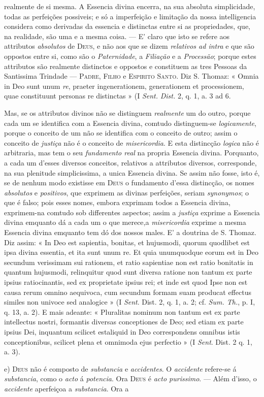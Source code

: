 realmente de si mesma. A Essencia divina encerra, na sua absoluta simplicidade, todas as perfeições possiveis; e só a imperfeição e limitação da nossa intelligencia considera como derivadas da essencia e distinctas entre si as propriedades, que, na realidade, são uma e a mesma coisa. --- E' claro que isto se refere aos attributos \emph{absolutos} de \textsc{Deus}, e não aos que se dizem \emph{relativos ad intra} e que são oppostos entre si, como são o \emph{Paternidade}, a \emph{Filiação} e a \emph{Processão}; porque estes attributos são realmente distinctos e oppostos e constituem as tres Pessoas da Santissima Trindade --- \textsc{Padre}, \textsc{Filho} e \textsc{Espirito Santo}. Diz S. Thomaz: « Omnia in Deo sunt unum \emph{re}, praeter ingenerationem, generationem et processionem, quae constituunt personas re distinctas » (I \emph{Sent.} \emph{Dist.} 2, q. 1, a. 3 ad 6.\par Mas, se os attributos divinos não se distinguem \emph{realmente} um do outro, porque cada um se identifica com a Essencia divina, comtudo distinguem-se \emph{logicamente}, porque o conceito de um não se identifica com o conceito de outro; assim o conceito de \emph{justiça} não é o conceito de \emph{misericordia}. E esta distincção \emph{logica} não é arbitraria, mas tem o seu \emph{fundamento real} na propria Essencia divina. Porquanto, a cada um d'esses diversos conceitos, relativos a attributos diversos, corresponde, na sua plenitude simplicissima, a unica Essencia divina. Se assim não fosse, isto é, se de nenhum modo existisse em \textsc{Deus} o fundamento d'essa distincção, os nomes \emph{absolutos} e \emph{positivos}, que exprimem as divinas perfeições, seriam \emph{synonymos}; o que é falso; pois esses nomes, embora exprimam todos a Essencia divina, exprimem-na comtudo sob differentes aspectos; assim a \emph{justiça} exprime a Essencia divina emquanto dá a cada um o que merece,a \emph{misericordia} exprime a mesma Essencia divina emquanto tem dó dos nossos males. E' a doutrina de S. Thomaz. Diz assim: « In Deo est sapientia, bonitas, et hujusmodi, quorum quodlibet est ipsa divina essentia, et ita sunt unum re. Et quia unumquodque eorum est in Deo secundum verissimam sui rationem, et ratio sapientiae non est ratio bonitatis in quantum hujusmodi, relinquitur quod sunt diversa ratione non tantum ex parte ipsius ratiocinantis, sed ex proprietate ipsius rei; et inde est quod Ipse non est causa rerum omnino aequivoca, cum secundum formam suam producat effectus similes non univoce sed analogice » (I \emph{Sent}. Dist. 2, q. 1, a. 2; cf. \emph{Sum. Th.}, p. I, q. 13, a. 2). E mais adeante: « Pluralitas nominum non tantum est ex parte intellectus nostri, formantis diversas conceptiones de Deo; sed etiam ex parte ipsius Dei, inquantum scilicet estaliquid in Deo correspondens omnibus istis conceptionibus, scilicet plena et omnimoda ejus perfectio » (I \emph{Sent}. Dist. 2 q. 1, a. 3).\par e) \textsc{Deus} não é composto de \emph{substancia} e \emph{accidentes}. O \emph{accidente} refere-se á \emph{substancia}, como o \emph{acto} á \emph{potencia}. Ora \textsc{Deus} é \emph{acto purissimo}. --- Além d'isso, o \emph{accidente} aperfeiçoa a \emph{substancia}. Ora a 